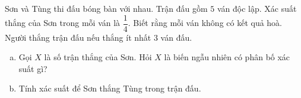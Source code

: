 \begin{bt}%

	Sơn và Tùng thi đấu bóng bàn với nhau. Trận đấu gồm $5$ ván độc lập. Xác suất thắng của Sơn trong mỗi ván là $\dfrac{1}{4}$. Biết rằng mỗi ván không có kết quả hoà. Người thắng trận đấu nếu thắng ít nhất $3$ ván đấu.
	\begin{enumerate}[a)]
		\item Gọi $X$ là số trận thắng của Sơn. Hỏi $X$ là biến ngẫu nhiên có phân bố xác suất gì?
		\item Tính xác suất để Sơn thắng Tùng trong trận đấu.
	\end{enumerate}	
\end{bt}

